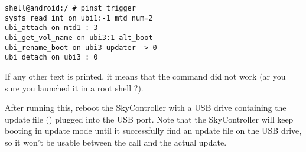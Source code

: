 \texttt{shell@android:/ \# pinst\_trigger \\
sysfs\_read\_int on ubi1:-1 mtd\_num=2 \\
ubi\_attach on mtd1 : 3 \\
ubi\_get\_vol\_name on ubi3:1 alt\_boot \\
ubi\_rename\_boot on ubi3 updater -> 0 \\
ubi\_detach on ubi3 : 0}

If any other text is printed, it means that the command did not work (ar you sure you launched it in a root shell ?).

After running this, reboot the SkyController with a USB drive containing the update file () plugged into the USB port. Note that the SkyController will keep booting in update mode until it successfully find an update file on the USB drive, so it won't be usable between the  call and the actual update.


